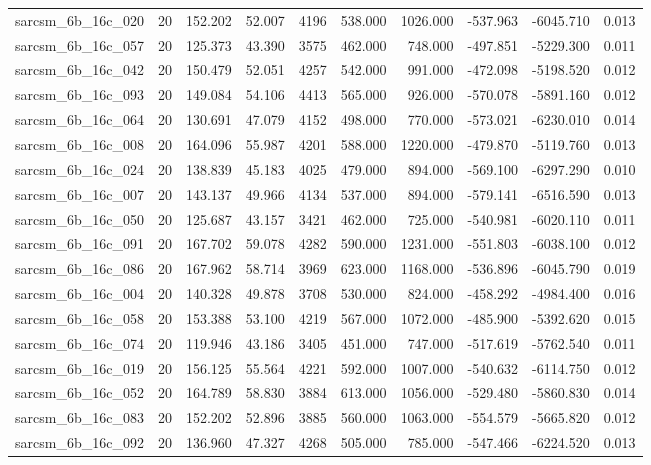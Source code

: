 \begin{tabular}{lrrrrrrrrr}
sarcsm\_6b\_16c\_020 & 20 & 152.202 & 52.007 & 4196 & 538.000 & 1026.000 & -537.963 & -6045.710 & 0.013 \\
sarcsm\_6b\_16c\_057 & 20 & 125.373 & 43.390 & 3575 & 462.000 & 748.000 & -497.851 & -5229.300 & 0.011 \\
sarcsm\_6b\_16c\_042 & 20 & 150.479 & 52.051 & 4257 & 542.000 & 991.000 & -472.098 & -5198.520 & 0.012 \\
sarcsm\_6b\_16c\_093 & 20 & 149.084 & 54.106 & 4413 & 565.000 & 926.000 & -570.078 & -5891.160 & 0.012 \\
sarcsm\_6b\_16c\_064 & 20 & 130.691 & 47.079 & 4152 & 498.000 & 770.000 & -573.021 & -6230.010 & 0.014 \\
sarcsm\_6b\_16c\_008 & 20 & 164.096 & 55.987 & 4201 & 588.000 & 1220.000 & -479.870 & -5119.760 & 0.013 \\
sarcsm\_6b\_16c\_024 & 20 & 138.839 & 45.183 & 4025 & 479.000 & 894.000 & -569.100 & -6297.290 & 0.010 \\
sarcsm\_6b\_16c\_007 & 20 & 143.137 & 49.966 & 4134 & 537.000 & 894.000 & -579.141 & -6516.590 & 0.013 \\
sarcsm\_6b\_16c\_050 & 20 & 125.687 & 43.157 & 3421 & 462.000 & 725.000 & -540.981 & -6020.110 & 0.011 \\
sarcsm\_6b\_16c\_091 & 20 & 167.702 & 59.078 & 4282 & 590.000 & 1231.000 & -551.803 & -6038.100 & 0.012 \\
sarcsm\_6b\_16c\_086 & 20 & 167.962 & 58.714 & 3969 & 623.000 & 1168.000 & -536.896 & -6045.790 & 0.019 \\
sarcsm\_6b\_16c\_004 & 20 & 140.328 & 49.878 & 3708 & 530.000 & 824.000 & -458.292 & -4984.400 & 0.016 \\
sarcsm\_6b\_16c\_058 & 20 & 153.388 & 53.100 & 4219 & 567.000 & 1072.000 & -485.900 & -5392.620 & 0.015 \\
sarcsm\_6b\_16c\_074 & 20 & 119.946 & 43.186 & 3405 & 451.000 & 747.000 & -517.619 & -5762.540 & 0.011 \\
sarcsm\_6b\_16c\_019 & 20 & 156.125 & 55.564 & 4221 & 592.000 & 1007.000 & -540.632 & -6114.750 & 0.012 \\
sarcsm\_6b\_16c\_052 & 20 & 164.789 & 58.830 & 3884 & 613.000 & 1056.000 & -529.480 & -5860.830 & 0.014 \\
sarcsm\_6b\_16c\_083 & 20 & 152.202 & 52.896 & 3885 & 560.000 & 1063.000 & -554.579 & -5665.820 & 0.012 \\
sarcsm\_6b\_16c\_092 & 20 & 136.960 & 47.327 & 4268 & 505.000 & 785.000 & -547.466 & -6224.520 & 0.013 \\

\end{tabular}
